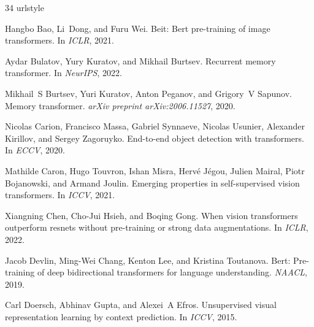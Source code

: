 \documentclass{article} \usepackage{iclr2024_conference,times}
\begin{document}
\begin{thebibliography}{34}
\providecommand{\natexlab}[1]{#1}
\providecommand{\url}[1]{\texttt{#1}}
\expandafter\ifx\csname urlstyle\endcsname\relax
  \providecommand{\doi}[1]{doi: #1}\else
  \providecommand{\doi}{doi: \begingroup \urlstyle{rm}\Url}\fi

Hangbo Bao, Li~Dong, and Furu Wei.
\newblock Beit: Bert pre-training of image transformers.
\newblock In \emph{ICLR}, 2021.

Aydar Bulatov, Yury Kuratov, and Mikhail Burtsev.
\newblock Recurrent memory transformer.
\newblock In \emph{NeurIPS}, 2022.

Mikhail~S Burtsev, Yuri Kuratov, Anton Peganov, and Grigory~V Sapunov.
\newblock Memory transformer.
\newblock \emph{arXiv preprint arXiv:2006.11527}, 2020.

Nicolas Carion, Francisco Massa, Gabriel Synnaeve, Nicolas Usunier, Alexander
  Kirillov, and Sergey Zagoruyko.
\newblock End-to-end object detection with transformers.
\newblock In \emph{ECCV}, 2020.

Mathilde Caron, Hugo Touvron, Ishan Misra, Herv{\'e} J{\'e}gou, Julien Mairal,
  Piotr Bojanowski, and Armand Joulin.
\newblock Emerging properties in self-supervised vision transformers.
\newblock In \emph{ICCV}, 2021.

Xiangning Chen, Cho-Jui Hsieh, and Boqing Gong.
\newblock When vision transformers outperform resnets without pre-training or
  strong data augmentations.
\newblock In \emph{ICLR}, 2022.

Jacob Devlin, Ming-Wei Chang, Kenton Lee, and Kristina Toutanova.
\newblock Bert: Pre-training of deep bidirectional transformers for language
  understanding.
\newblock \emph{NAACL}, 2019.

Carl Doersch, Abhinav Gupta, and Alexei~A Efros.
\newblock Unsupervised visual representation learning by context prediction.
\newblock In \emph{ICCV}, 2015.


\end{thebibliography}
\end{document}

